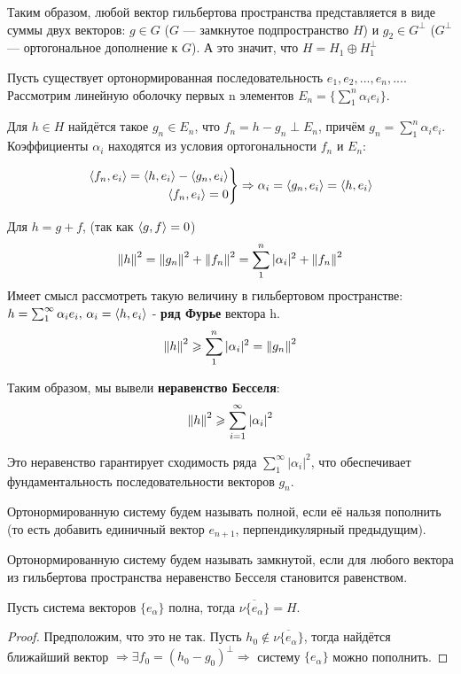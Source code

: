 \documentclass[12pt]{article}
\begin{document}
	Таким образом, любой вектор гильбертова пространства представляется в виде суммы двух векторов:
	$g \in G$ ($G$ --- замкнутое подпространство $H$) и $g_2 \in G^\perp$ ($G^\perp$ --- ортогональное дополнение к $G$).
	А это значит, что $H = H_1 \oplus H_1^\perp$
	
	Пусть существует ортонормированная последовательность $e_1, e_2, ..., e_n, ...$. Рассмотрим линейную 
	оболочку первых n элементов $E_n = \{ \sum_1^n \alpha_i e_i \}$.

	Для $h \in H$ найдётся такое $g_n \in E_n$, что $f_n = h - g_n \perp E_n$, причём 
	$g_n = \sum_1^n \alpha_i e_i$. Коэффициенты $\alpha_i$ находятся из условия ортогональности $f_n$ и $E_n$:

    $$
        \left.
        \begin{aligned}
            \left\langle f_n, e_i \right\rangle = \left\langle h, e_i \right\rangle - \left\langle g_n, e_i \right\rangle \\
            \left\langle f_n, e_i \right\rangle = 0
        \end{aligned}
        \right\} \Rightarrow \alpha_i = \left\langle g_n, e_i \right\rangle = \left\langle h, e_i \right\rangle
    $$

	Для $h = g + f$, (так как $\left\langle g, f \right\rangle = 0$)
	$$ \left\| h \right\|^2 = \left\| g_n \right\|^2 + \left\| f_n \right\|^2 = \sum_1^n |\alpha_i|^2 + \left\| f_n \right\|^2$$
	Имеет смысл рассмотреть такую величину в гильбертовом пространстве: 
	$h = \sum_1^{\infty} \alpha_i e_i,\, \alpha_i = \left\langle h, e_i \right\rangle$ -
	\textbf{ряд Фурье} вектора h.
	$$ \left\| h \right\|^2 \geqslant \sum_1^n |\alpha_i|^2 = \left\| g_n \right\|^2 $$

	
	Таким образом, мы вывели \textbf{неравенство Бесселя}:
	$$ \left\| h \right\|^2 \geqslant \sum_{i=1}^{\infty} \left| \alpha_i \right|^2 $$

	Это неравенство гарантирует сходимость ряда $\sum_1^{\infty} |\alpha_i|^2$, что обеспечивает фундаментальность 
	последовательности векторов $g_n$.
	
	\begin{defi}
		Ортонормированную систему будем называть полной, если её нальзя пополнить (то есть добавить единичный вектор $e_{n+1}$, 
		перпендикулярный предыдущим).
	\end{defi}
	\begin{defi}
		Ортонормированную систему будем называть замкнутой, если для любого вектора из гильбертова пространства неравенство Бесселя
		становится равенством.
	\end{defi}
	
	\begin{state}
		Пусть система векторов $\{ e_\alpha \}$ полна, тогда $\overline{ \nu \{ e_\alpha \} } = H$.
	\end{state}
	\begin{proof}
		Предположим, что это не так. Пусть $h_0 \notin \overline{ \nu \{ e_\alpha \} }$, тогда найдётся ближайший вектор $\Rightarrow 
		\exists f_0 	= (h_0 - g_0)^\perp	\Rightarrow$ систему $\{ e_{\alpha} \}$ можно пополнить.
	\end{proof}
	
\end{document}
